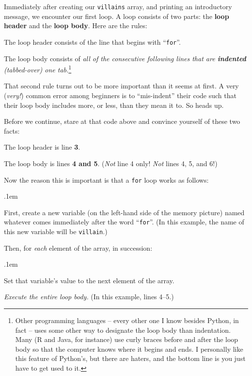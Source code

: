 Immediately after creating our \texttt{villains} array, and printing an
introductory message, we encounter our first loop. A loop consists of two
parts: the \textbf{loop header} and the \textbf{loop body}. Here are the rules:


\begin{compactitem}
\item The loop header consists of the line that begins with ``\texttt{for}''.
\item The loop body consists of \textit{all of the consecutive following lines
that are \textbf{indented} (tabbed-over) one tab.}\footnote{Other programming
languages -- every other one I know besides Python, in fact -- uses some other
way to designate the loop body than indentation. Many (R and Java, for
instance) use curly braces before and after the loop body so that the computer
knows where it begins and ends. I personally like this feature of Python's, but
there are haters, and the bottom line is you just have to get used to it.}
\end{compactitem}

That second rule turns out to be more important than it seems at first. A very
(\textit{very!}) common error among beginners is to ``mis-indent'' their code
such that their loop body includes more, or less, than they mean it to. So
heads up.

Before we continue, stare at that code above and convince yourself of these two
facts:

\begin{compactitem}
\item[\leftpointright] The loop header is line \textbf{3}.
\item[\leftpointright] The loop body is lines \textbf{4 and 5}. (\textit{Not} line 4
only! \textit{Not} lines 4, 5, and 6!)
\end{compactitem}

\medskip
Now the reason this is important is that a \texttt{for} loop works as follows:
\vspace{-.1in}


\begin{shaded}
\begin{compactenum}
\itemsep.1em
\item First, create a new variable (on the left-hand side of the memory
picture) named whatever comes immediately after the word ``\texttt{for}''. (In
this example, the name of this new variable will be \texttt{villain}.)
\item Then, for \textit{each} element of the array, in succession:
    \begin{compactenum}
    \itemsep.1em
    \item Set that variable's value to the next element of the array.
    \item \textit{Execute the entire loop body.} (In this example, lines 4--5.)
    \end{compactenum}
\end{compactenum}
\end{shaded}

